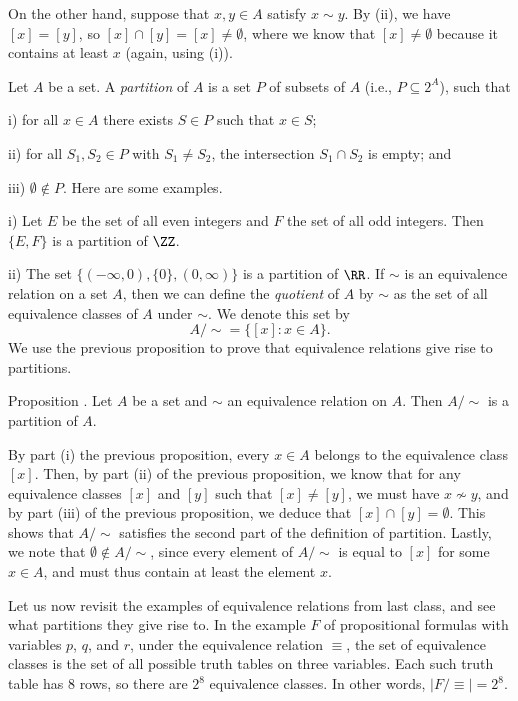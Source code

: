 On the other hand, suppose that $x,y\in A$ satisfy $x\sim y$.
By (ii), we have $[x] = [y]$, so $[x] \cap [y] = [x] \ne \emptyset$,
where we know that $[x]\ne \emptyset$ because it contains at least $x$ (again, using (i)).\slug

Let $A$ be a set. A {\it partition} of $A$ is a set $P$ of subsets
of $A$ (i.e., $P\subseteq 2^A$), such that
\medskip
\item{i)} for all $x\in A$ there exists $S\in P$ such that $x\in S$;
\smallskip
\item{ii)} for all $S_1, S_2\in P$ with $S_1\ne S_2$, the intersection $S_1\cap S_2$ is empty; and
\smallskip
\item{iii)} $\emptyset\notin P$.
\medskip
Here are some examples.
\medskip
\item{i)} Let $E$ be the set of all even integers and $F$ the set of all odd integers. Then $\{E,F\}$
is a partition of $\ZZ$.
\smallskip
\item{ii)} The set $\bigl\{ (-\infty,0), \{0\}, (0,\infty)\bigr\}$ is a partition of $\RR$.
\medskip
\bye
If $\sim$ is an equivalence relation on a set $A$, then we can define the {\it quotient}
of $A$ by $\sim$ as the set of all equivalence classes of $A$ under $\sim$. We denote this set by
$$A/{\sim} = \bigl\{ [x] : x\in A\bigr\}.$$
We use the previous proposition to prove that equivalence relations give rise to partitions.

\proclaim Proposition \advthm. Let $A$ be a set and $\sim$ an equivalence relation on $A$.
Then $A/{\sim}$ is a partition of $A$.

\proof By part (i) the previous proposition, every $x\in A$ belongs to the equivalence class $[x]$.
Then, by part (ii) of the previous proposition, we know that for any equivalence classes
$[x]$ and $[y]$ such that $[x]\ne [y]$, we must have $x\not\sim y$, and by part (iii) of the previous
proposition, we deduce that $[x]\cap [y]=\emptyset$. This shows that $A/\sim$ satisfies the second
part of the definition of partition. Lastly, we note that $\emptyset\notin A/\sim$, since
every element of $A/\sim$ is equal to $[x]$ for some $x\in A$, and must thus contain at least
the element $x$.\slug

Let us now revisit the examples of equivalence relations from last class, and see what partitions
they give rise to. In the example $F$ of propositional formulas with variables $p$, $q$, and $r$,
under the equivalence relation $\equiv$, the set of equivalence classes is the set of all possible
truth tables on three variables. Each such truth table has $8$ rows, so there are $2^8$ equivalence
classes. In other words, $|F/\equiv| = 2^8$.

